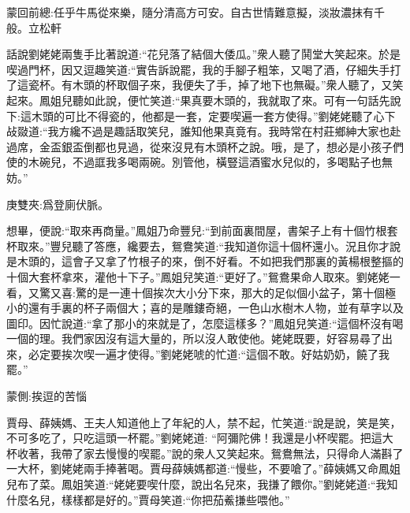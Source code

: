 
\begin{parag}
    \begin{note}蒙回前總:任乎牛馬從來樂，隨分清高方可安。自古世情難意擬，淡妝濃抹有千般。立松軒\end{note}
\end{parag}


\begin{parag}
    話說劉姥姥兩隻手比著說道:“花兒落了結個大倭瓜。”衆人聽了鬨堂大笑起來。於是喫過門杯，因又逗趣笑道:“實告訴說罷，我的手腳子粗笨，又喝了酒，仔細失手打了這瓷杯。有木頭的杯取個子來，我便失了手，掉了地下也無礙。”衆人聽了，又笑起來。鳳姐兒聽如此說，便忙笑道:“果真要木頭的，我就取了來。可有一句話先說下:這木頭的可比不得瓷的，他都是一套，定要喫遍一套方使得。”劉姥姥聽了心下敁敠道:“我方纔不過是趣話取笑兒，誰知他果真竟有。我時常在村莊鄉紳大家也赴過席，金盃銀盃倒都也見過，從來沒見有木頭杯之說。哦，是了，想必是小孩子們使的木碗兒，不過誆我多喝兩碗。別管他，橫豎這酒蜜水兒似的，多喝點子也無妨。”\begin{note}庚雙夾:爲登廁伏脈。\end{note}想畢，便說:“取來再商量。”鳳姐乃命豐兒:“到前面裏間屋，書架子上有十個竹根套杯取來。”豐兒聽了答應，纔要去，鴛鴦笑道:“我知道你這十個杯還小。況且你才說是木頭的，這會子又拿了竹根子的來，倒不好看。不如把我們那裏的黃楊根整摳的十個大套杯拿來，灌他十下子。”鳳姐兒笑道:“更好了。”鴛鴦果命人取來。劉姥姥一看，又驚又喜:驚的是一連十個挨次大小分下來，那大的足似個小盆子，第十個極小的還有手裏的杯子兩個大；喜的是雕鏤奇絕，一色山水樹木人物，並有草字以及圖印。因忙說道:“拿了那小的來就是了，怎麼這樣多？”鳳姐兒笑道:“這個杯沒有喝一個的理。我們家因沒有這大量的，所以沒人敢使他。姥姥既要，好容易尋了出來，必定要挨次喫一遍才使得。”劉姥姥唬的忙道:“這個不敢。好姑奶奶，饒了我罷。”\begin{note}蒙側:挨逗的苦惱\end{note}賈母、薛姨媽、王夫人知道他上了年紀的人，禁不起，忙笑道:“說是說，笑是笑，不可多吃了，只吃這頭一杯罷。”劉姥姥道: “阿彌陀佛！我還是小杯喫罷。把這大杯收著，我帶了家去慢慢的喫罷。”說的衆人又笑起來。鴛鴦無法，只得命人滿斟了一大杯，劉姥姥兩手捧著喝。賈母薛姨媽都道:“慢些，不要嗆了。”薛姨媽又命鳳姐兒布了菜。鳳姐笑道:“姥姥要喫什麼，說出名兒來，我搛了餵你。”劉姥姥道:“我知什麼名兒，樣樣都是好的。”賈母笑道:“你把茄鮺搛些喂他。” 
\end{parag}
